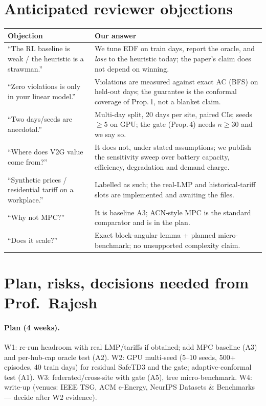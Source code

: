 \documentclass[10pt,a4paper]{article}
\begin{document}
\section{Anticipated reviewer objections}
\begin{longtable}{@{}p{.36\linewidth}p{.60\linewidth}@{}}
\toprule Objection & Our answer\\\midrule\endhead
``The RL baseline is weak / the heuristic is a strawman.'' & We tune EDF on train days, report the oracle, and \emph{lose} to the heuristic today; the paper's claim does not depend on winning.\\
``Zero violations is only in your linear model.'' & Violations are measured against exact AC (BFS) on held-out days; the guarantee is the conformal coverage of Prop.\,1, not a blanket claim.\\
``Two days/seeds are anecdotal.'' & Multi-day split, 20 days per site, paired CIs; seeds $\ge5$ on GPU; the gate (Prop.\,4) needs $n\ge30$ and we say so.\\
``Where does V2G value come from?'' & It does not, under stated assumptions; we publish the sensitivity sweep over battery capacity, efficiency, degradation and demand charge.\\
``Synthetic prices / residential tariff on a workplace.'' & Labelled as such; the real-LMP and historical-tariff slots are implemented and awaiting the files.\\
``Why not MPC?'' & It is baseline A3; ACN-style MPC is the standard comparator and is in the plan.\\
``Does it scale?'' & Exact block-angular lemma + planned micro-benchmark; no unsupported complexity claim.\\
\bottomrule\end{longtable}

\section{Plan, risks, decisions needed from Prof.\ Rajesh}
\paragraph{Plan (4 weeks).} W1: re-run headroom with real LMP/tariffs if obtained; add MPC baseline (A3) and per-hub-cap oracle test (A2). W2: GPU multi-seed
(5--10 seeds, 500+ episodes, 40 train days) for residual SafeTD3 and the gate; adaptive-conformal test (A1). W3: federated/cross-site with gate (A5), tree micro-benchmark. W4: write-up (venues:
IEEE TSG, ACM e-Energy, NeurIPS Datasets \& Benchmarks --- decide after W2 evidence).
\end{document}
